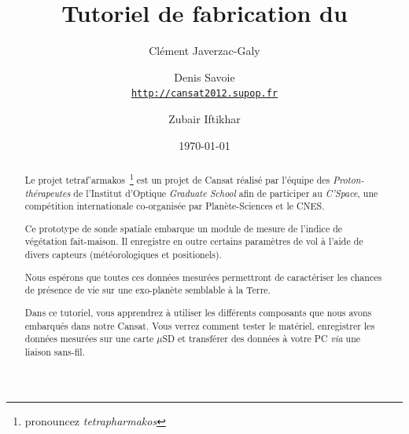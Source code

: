 \documentclass[twocolumn, 8pt]{article}
\title{Tutoriel de fabrication du \tet}
\author{Clément Javerzac-Galy \and{Denis Savoie}\\
	\texttt{\url{http://cansat2012.supop.fr}}
\and{Zubair Iftikhar}
}
\date{\today}
\newcommand\tet{\textgreek{tetraf'armakos}~}
\begin{document}
\maketitle

\begin{abstract}
    \begin{bfseries}
	    \par \small Le projet \tet \footnote{pronouncez \textit{tetrapharmakos}} est un projet de Cansat réalisé par l'équipe des \textit{Proton-thérapeutes} de l'Institut d'Optique \textit{Graduate School} afin de participer au \textit{C'Space}, une compétition internationale co-organisée par Planète-Sciences et le CNES. 
	    \par \small Ce prototype de sonde spatiale embarque un module de mesure de l'indice de végétation fait-maison. Il enregistre en outre certains paramètres de vol à l'aide de divers capteurs (météorologiques et positionels).
    \par \small Nous espérons que toutes ces données mesurées permettront de caractériser les chances de présence de vie sur une exo-planète semblable à la Terre.
    \par \small Dans ce tutoriel, vous apprendrez à utiliser les différents composants que nous avons embarqués dans notre Cansat. Vous verrez comment tester le matériel, enregistrer les données mesurées sur une carte $\mu$SD et transférer des données à votre PC \textit{via} une liaison sans-fil.
     \end{bfseries}
\end{abstract}
\end{document}
